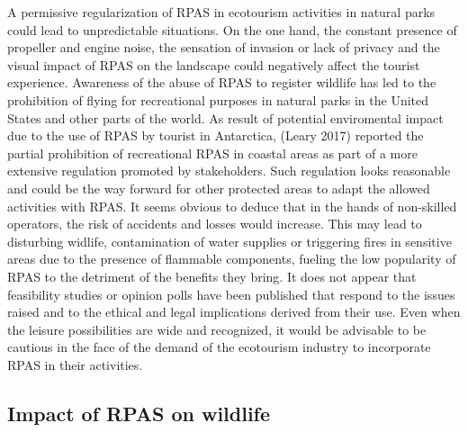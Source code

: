 \documentclass[]{interact}
\theoremstyle{plain}%
\theoremstyle{definition}
\theoremstyle{remark}
\begin{document}
A permissive regularization of RPAS in ecotourism activities in natural
parks could lead to unpredictable situations. On the one hand, the
constant presence of propeller and engine noise, the sensation of
invasion or lack of privacy and the visual impact of RPAS on the
landscape could negatively affect the tourist experience. Awareness of
the abuse of RPAS to register wildlife has led to the prohibition of
flying for recreational purposes in natural parks in the United States
and other parts of the world. As result of potential enviromental impact
due to the use of RPAS by tourist in Antarctica, (Leary 2017) reported
the partial prohibition of recreational RPAS in coastal areas as part of
a more extensive regulation promoted by stakeholders. Such regulation
looks reasonable and could be the way forward for other protected areas
to adapt the allowed activities with RPAS. It seems obvious to deduce
that in the hands of non-skilled operators, the risk of accidents and
losses would increase. This may lead to disturbing widlife,
contamination of water supplies or triggering fires in sensitive areas
due to the presence of flammable components, fueling the low popularity
of RPAS to the detriment of the benefits they bring. It does not appear
that feasibility studies or opinion polls have been published that
respond to the issues raised and to the ethical and legal implications
derived from their use. Even when the leisure possibilities are wide and
recognized, it would be advisable to be cautious in the face of the
demand of the ecotourism industry to incorporate RPAS in their
activities.

\subsection{Impact of RPAS on
wildlife}\label{impact-of-rpas-on-wildlife-1}
\end{document}
